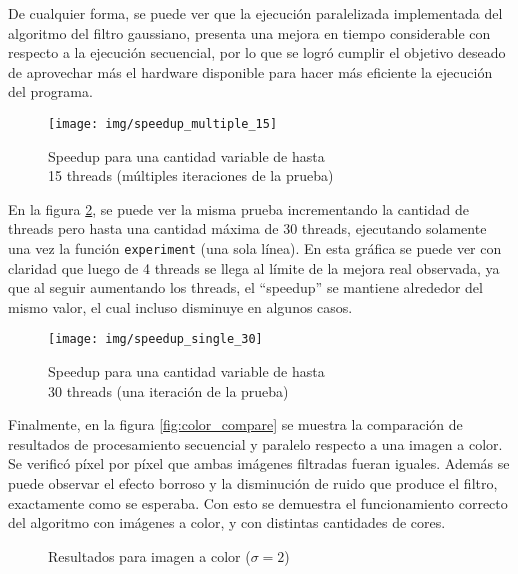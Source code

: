 \documentclass {article}
\begin{document}
De cualquier forma, se puede ver que la ejecución paralelizada implementada del algoritmo del filtro
gaussiano, presenta una mejora en tiempo considerable con respecto a la ejecución secuencial, por lo
que se logró cumplir el objetivo deseado de aprovechar más el hardware disponible para hacer más
eficiente la ejecución del programa.

\begin{figure}[H]
  \centering
  \texttt{[image: img/speedup\_multiple\_15]}
  \caption{\label{fig:speedup_multiple_15}Speedup para una cantidad variable de hasta \\15 threads (múltiples iteraciones de la prueba)}
\end{figure}

En la figura \ref{fig:speedup_single_30}, se puede ver la misma prueba incrementando la cantidad de
threads pero hasta una cantidad máxima de 30 threads, ejecutando solamente una vez la función
\texttt{experiment} (una sola línea). En esta gráfica se puede ver con claridad que luego de 4
threads se llega al límite de la mejora real observada, ya que al seguir aumentando los threads, el
``speedup'' se mantiene alrededor del mismo valor, el cual incluso disminuye en algunos casos. 

\begin{figure}[H]
  \centering
  \texttt{[image: img/speedup\_single\_30]}
  \caption{\label{fig:speedup_single_30}Speedup para una cantidad variable de hasta \\30 threads (una iteración de la prueba)}
\end{figure}

Finalmente, en la figura \ref{fig:color_compare} se muestra la comparación de resultados
de procesamiento secuencial y paralelo respecto a una imagen a color. Se verificó píxel por píxel
que ambas imágenes filtradas fueran iguales. Además se puede observar el efecto borroso y la
disminución de ruido que produce
el filtro, exactamente como se esperaba. Con esto se demuestra el funcionamiento correcto del
algoritmo con imágenes a color, y con distintas cantidades de cores.

\begin{figure}[H]
  \centering
  \caption{\label{fig:result_filtro}Resultados para imagen a color ($\sigma=2$)\protect}
\end{figure}
\end{document}
